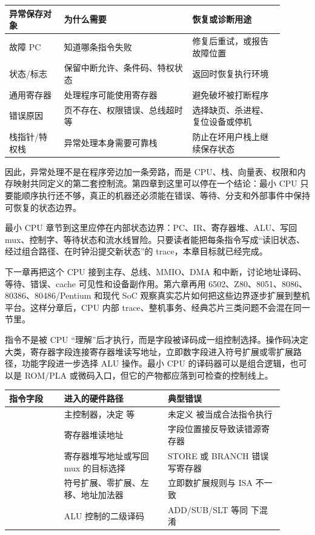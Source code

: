 \begin{longtable}{L{0.18\linewidth}L{0.42\linewidth}L{0.3\linewidth}}
\toprule
异常保存对象 & 为什么需要 & 恢复或诊断用途 \\
\midrule
故障 PC & 知道哪条指令失败 & 修复后重试，或报告故障位置 \\
状态/标志 & 保留中断允许、条件码、特权状态 & 返回时恢复执行环境 \\
通用寄存器 & 处理程序可能使用寄存器 & 避免破坏被打断程序 \\
错误原因 & 页不存在、权限错误、总线超时等 & 选择缺页、杀进程、复位设备或停机 \\
栈指针/特权栈 & 异常处理本身需要可靠栈 & 防止在坏用户栈上继续保存状态 \\
\bottomrule
\end{longtable}

因此，异常处理不是在程序旁边加一条旁路，而是 CPU、栈、向量表、权限和内存映射共同定义的第二套控制流。第四章到这里可以停在一个结论：最小 CPU 只要能顺序执行还不够，真正的机器还必须能在错误、等待、分支和外部事件中保持可恢复的状态边界。

最小 CPU 章节到这里应停在内部状态边界：PC、IR、寄存器堆、ALU、写回 mux、控制字、等待状态和流水线冒险。只要读者能把每条指令写成“读旧状态、经过组合路径、在时钟沿提交新状态”的 trace，本章目标就已经完成。

下一章再把这个 CPU 接到主存、总线、MMIO、DMA 和中断，讨论地址译码、等待、错误、cache 可见性和设备副作用。第六章再用 6502、Z80、8051、8086、80386、80486/Pentium 和现代 SoC 观察真实芯片如何把这些边界逐步扩展到整机平台。这样分章后，CPU 内部 trace、整机事务、经典芯片三类问题不会混在同一节里。

指令不是被 CPU “理解”后才执行，而是字段被译码成一组控制选择。操作码决定大类，寄存器字段连接寄存器堆读写地址，立即数字段进入符号扩展或零扩展路径，功能字段进一步选择 ALU 操作。最小 CPU 的译码器可以是组合逻辑，也可以是 ROM/PLA 或微码入口，但它的产物都应落到可检查的控制线上。

\begin{longtable}{L{0.18\linewidth}L{0.34\linewidth}L{0.38\linewidth}}
\toprule
指令字段 & 进入的硬件路径 & 典型错误 \\
\midrule
{} & 主控制器，决定  等 & 未定义  被当成合法指令执行 \\
 & 寄存器堆读地址 & 字段位置接反导致读错源寄存器 \\
 & 寄存器堆写地址或写回 mux 的目标选择 & STORE 或 BRANCH 错误写寄存器 \\
 & 符号扩展、零扩展、左移、地址加法器 & 立即数扩展规则与 ISA 不一致 \\
 & ALU 控制的二级译码 & ADD/SUB/SLT 等同  下混淆 \\
\bottomrule
\end{longtable}

